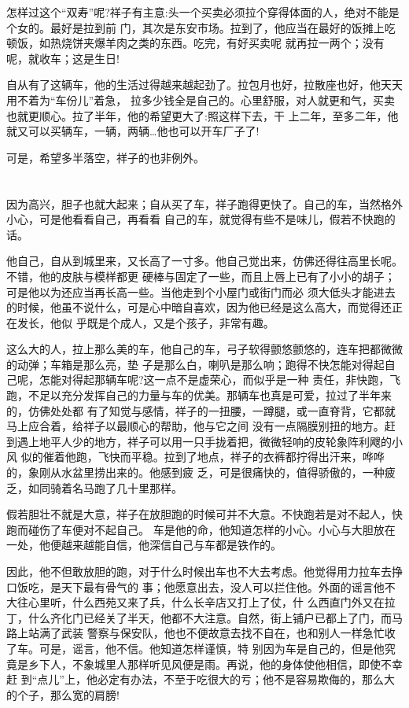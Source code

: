 \documentclass[11pt,a4paper,onecolumn]{article}
\begin{document}
怎样过这个``双寿''呢?祥子有主意:头一个买卖必须拉个穿得体面的人，绝对不能是个女的。最好是拉到前
门，其次是东安市场。拉到了，他应当在最好的饭摊上吃顿饭，如热烧饼夹爆羊肉之类的东西。吃完，有好买卖呢
就再拉一两个；没有呢，就收车；这是生日!

自从有了这辆车，他的生活过得越来越起劲了。拉包月也好，拉散座也好，他天天用不着为``车份儿''着急，
拉多少钱全是自己的。心里舒服，对人就更和气，买卖也就更顺心。拉了半年，他的希望更大了:照这样下去，干
上二年，至多二年，他就又可以买辆车，一辆，两辆\ldots 他也可以开车厂子了!

可是，希望多半落空，祥子的也非例外。

\pagebreak
\section{}

因为高兴，胆子也就大起来；自从买了车，祥子跑得更快了。自己的车，当然格外小心，可是他看看自己，再看看
自己的车，就觉得有些不是味儿，假若不快跑的话。

他自己，自从到城里来，又长高了一寸多。他自己觉出来，仿佛还得往高里长呢。不错，他的皮肤与模样都更
硬棒与固定了一些，而且上唇上已有了小小的胡子；可是他以为还应当再长高一些。当他走到个小屋门或街门而必
须大低头才能进去的时候，他虽不说什么，可是心中暗自喜欢，因为他已经是这么高大，而觉得还正在发长，他似
乎既是个成人，又是个孩子，非常有趣。

这么大的人，拉上那么美的车，他自己的车，弓子软得颤悠颤悠的，连车把都微微的动弹；车箱是那么亮，垫
子是那么白，喇叭是那么响；跑得不快怎能对得起自己呢，怎能对得起那辆车呢?这一点不是虚荣心，而似乎是一种
责任，非快跑，飞跑，不足以充分发挥自己的力量与车的优美。那辆车也真是可爱，拉过了半年来的，仿佛处处都
有了知觉与感情，祥子的一扭腰，一蹲腿，或一直脊背，它都就马上应合着，给祥子以最顺心的帮助，他与它之间
没有一点隔膜别扭的地方。赶到遇上地平人少的地方，祥子可以用一只手拢着把，微微轻响的皮轮象阵利飕的小风
似的催着他跑，飞快而平稳。拉到了地点，祥子的衣裤都拧得出汗来，哗哗的，象刚从水盆里捞出来的。他感到疲
乏，可是很痛快的，值得骄傲的，一种疲乏，如同骑着名马跑了几十里那样。

假若胆壮不就是大意，祥子在放胆跑的时候可并不大意。不快跑若是对不起人，快跑而碰伤了车便对不起自己。
车是他的命，他知道怎样的小心。小心与大胆放在一处，他便越来越能自信，他深信自己与车都是铁作的。

因此，他不但敢放胆的跑，对于什么时候出车也不大去考虑。他觉得用力拉车去挣口饭吃，是天下最有骨气的
事；他愿意出去，没人可以拦住他。外面的谣言他不大往心里听，什么西苑又来了兵，什么长辛店又打上了仗，什
么西直门外又在拉丁，什么齐化门已经关了半天，他都不大注意。自然，街上铺户已都上了门，而马路上站满了武装
警察与保安队，他也不便故意去找不自在，也和别人一样急忙收了车。可是，谣言，他不信。他知道怎样谨慎，特
别因为车是自己的，但是他究竟是乡下人，不象城里人那样听见风便是雨。再说，他的身体使他相信，即使不幸赶
到``点儿''上，他必定有办法，不至于吃很大的亏；他不是容易欺侮的，那么大的个子，那么宽的肩膀!
\end{document}
